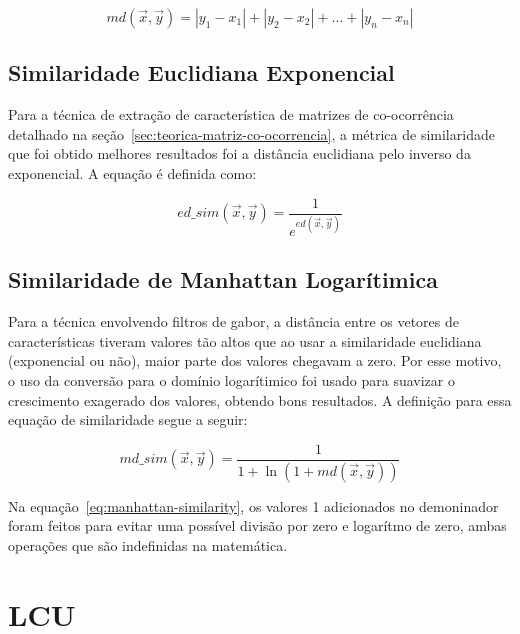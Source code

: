 \begin{equation}\label{eq:manhattan-distance}
md(\vec{x}, \vec{y}) = |y_1-x_1| + |y_2-x_2| + \ldots + |y_n-x_n|
\end{equation}

\subsection{Similaridade Euclidiana Exponencial}\label{sec:teorica-similaridade-euclidiana}

Para a técnica de extração de característica de matrizes de co-ocorrência
detalhado na seção~\ref{sec:teorica-matriz-co-ocorrencia}, a métrica de
similaridade que foi obtido melhores resultados foi a distância
euclidiana pelo inverso da exponencial. A equação é definida como:

\begin{equation}\label{eq:euclidian-similarity}
  ed\_sim(\vec{x}, \vec{y}) = \dfrac{1}{e^{ed(\vec{x}, \vec{y})}}
\end{equation}

\subsection{Similaridade de Manhattan Logarítimica}\label{sec:teorica-similaridade-manhattan}

Para a técnica envolvendo filtros de gabor, a distância entre os
vetores de características tiveram valores tão altos que ao usar a
similaridade euclidiana (exponencial ou não), maior parte dos valores
chegavam a zero. Por esse motivo, o uso da conversão para o domínio
logarítimico foi usado para suavizar o crescimento exagerado dos
valores, obtendo bons resultados. A definição para essa equação de
similaridade segue a seguir:

\begin{equation}\label{eq:manhattan-similarity}
  md\_sim(\vec{x}, \vec{y}) = \dfrac{1}{1 + \ln(1 + md(\vec{x}, \vec{y}))}
\end{equation}

Na equação~\ref{eq:manhattan-similarity}, os valores 1 adicionados no demoninador foram feitos para evitar uma
possível divisão por zero e logarítmo de zero,
ambas operações que são indefinidas na matemática.


\section{LCU}\label{sec:teorica-lcu}

